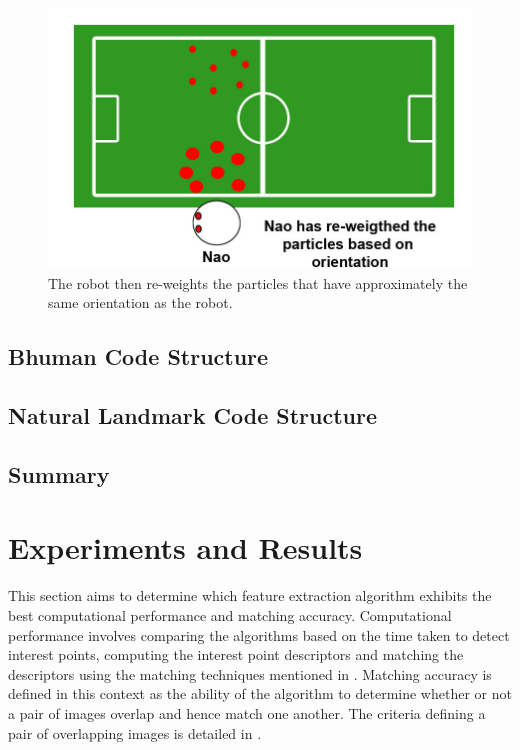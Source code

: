 \documentclass{report}
\begin{document}
\begin{figure}
\begin{minipage}[b]{0.5\linewidth}
\label{fig:turnedLeft}
\end{minipage}
\begin{minipage}[b]{0.5\linewidth}
\includegraphics[scale=0.2]{../Drawings/localisation/localisationAlgorithmReweight.jpg}
\caption{The robot then re-weights the particles that have approximately the same orientation as the robot.}
\label{fig:reweight}
\end{minipage}
\end{figure}


\section{Bhuman Code Structure}
\label{sec:codeStructure}

\section{Natural Landmark Code Structure}
\label{sec:naturalLandmarkCode}

\section{Summary}
\label{sec:summary4}



\chapter{Experiments and Results}
\label{sec:experimentsResults}
This section aims to determine which feature extraction algorithm exhibits the best  computational performance and matching accuracy. Computational performance involves comparing the algorithms based on the time taken to detect interest points, computing the interest point descriptors and matching the descriptors using the matching techniques mentioned in . Matching accuracy is defined in this context as the ability of the algorithm to determine whether or not a pair of images overlap and hence match one another. The criteria defining a pair of overlapping images is detailed in .\\
\end{document}
